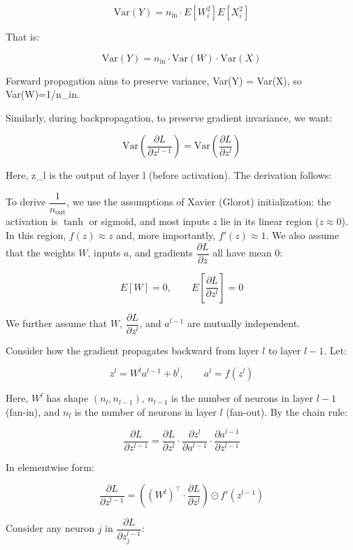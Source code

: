 \[
\mathrm{Var}(Y)=n_{\mathrm{in}}\cdot E[W_i^2]E[X_i^2]
\]

That is:

\[
\mathrm{Var}(Y)=n_{\mathrm{in}}\cdot \mathrm{Var}(W)\cdot \mathrm{Var}(X)
\]

Forward propagation aims to preserve variance, Var(Y) = Var(X), so Var(W)=1/n\_in.

Similarly, during backpropagation, to preserve gradient invariance, we want:

\[
\mathrm{Var}\left(\frac{\partial L}{\partial z^{l-1}}\right)
=\mathrm{Var}\left(\frac{\partial L}{\partial z^l}\right)
\]

Here, z\_l is the output of layer l (before activation). The derivation follows:

To derive \(\dfrac{1}{n_{\mathrm{out}}}\), we use the assumptions of Xavier (Glorot) initialization: the activation is \(\tanh\) or sigmoid, and most inputs \(z\) lie in its linear region (\(z\approx 0\)). In this region, \(f(z)\approx z\) and, more importantly, \(f'(z)\approx 1\). We also assume that the weights \(W\), inputs \(a\), and gradients \(\dfrac{\partial L}{\partial z}\) all have mean 0:

\[
E[W]=0,\qquad E\left[\frac{\partial L}{\partial z^l}\right]=0
\]

We further assume that \(W\), \(\dfrac{\partial L}{\partial z^l}\), and \(a^{l-1}\) are mutually independent.

Consider how the gradient propagates backward from layer \(l\) to layer \(l-1\). Let:

\[
z^l=W^la^{l-1}+b^l,\qquad a^l=f(z^l)
\]

Here, \(W^l\) has shape \((n_l,n_{l-1})\), \(n_{l-1}\) is the number of neurons in layer \(l-1\) (fan-in), and \(n_l\) is the number of neurons in layer \(l\) (fan-out). By the chain rule:

\[
\frac{\partial L}{\partial z^{l-1}}
=\frac{\partial L}{\partial z^l}\cdot
\frac{\partial z^l}{\partial a^{l-1}}\cdot
\frac{\partial a^{l-1}}{\partial z^{l-1}}
\]

In elementwise form:

\[
\frac{\partial L}{\partial z^{l-1}}
=\left((W^l)^\top\cdot\frac{\partial L}{\partial z^l}\right)
\odot f'(z^{l-1})
\]

Consider any neuron \(j\) in \(\dfrac{\partial L}{\partial z_j^{l-1}}\):

